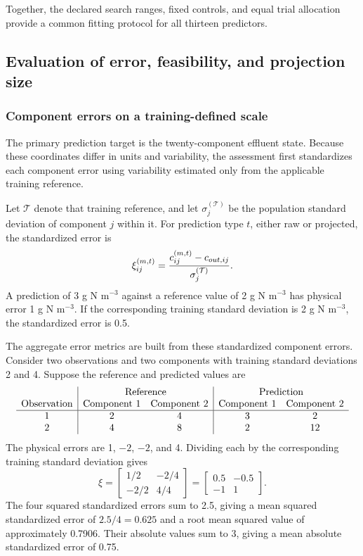 Together, the declared search ranges, fixed controls, and equal trial allocation provide a common fitting protocol for all thirteen predictors.

\subsection{Evaluation of error, feasibility, and projection size}

\subsubsection{Component errors on a training-defined scale}

The primary prediction target is the twenty-component effluent state. Because these coordinates differ in units and variability, the assessment first standardizes each component error using variability estimated only from the applicable training reference.

Let $\mathcal{T}$ denote that training reference, and let
$\sigma_j^{(\mathcal{T})}$
be the population standard deviation of component $j$ within it. For prediction type $t$, either raw or projected, the standardized error is
\begin{equation}
\equationname{Component error standardized by the training response scale}
\xi_{ij}^{(m,t)}=
\frac{c_{ij}^{(m,t)}-c_{out,ij}}{\sigma_j^{(\mathcal{T})}}.
\label{eq:projection_standardized_error}
\end{equation}
A prediction of 3 g N m$^{-3}$ against a reference value of 2 g N m$^{-3}$ has physical error 1 g N m$^{-3}$. If the corresponding training standard deviation is 2 g N m$^{-3}$, the standardized error is 0.5.

The aggregate error metrics are built from these standardized component errors. Consider two observations and two components with training standard deviations 2 and 4. Suppose the reference and predicted values are
\[
\begin{array}{c|cc|cc}
&\multicolumn{2}{c|}{\text{Reference}}&\multicolumn{2}{c}{\text{Prediction}}\\
\text{Observation}&\text{Component 1}&\text{Component 2}&\text{Component 1}&\text{Component 2}\\\hline
1&2&4&3&2\\
2&4&8&2&12
\end{array}
\]
The physical errors are 1, $-2$, $-2$, and 4. Dividing each by the corresponding training standard deviation gives
\[
\xi=\begin{bmatrix}1/2&-2/4\\-2/2&4/4\end{bmatrix}
=
\begin{bmatrix}0.5&-0.5\\-1&1\end{bmatrix}.
\]
The four squared standardized errors sum to 2.5, giving a mean squared standardized error of
$2.5/4=0.625$
and a root mean squared value of approximately 0.7906. Their absolute values sum to 3, giving a mean absolute standardized error of 0.75.

